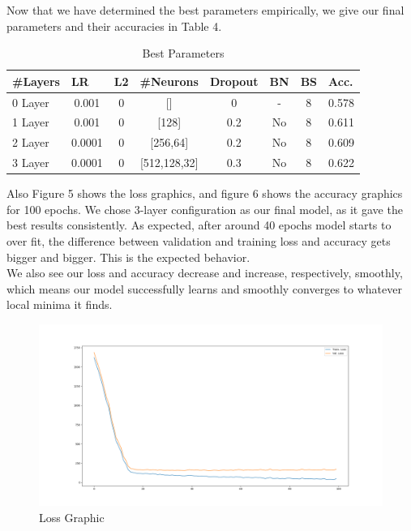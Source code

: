 \documentclass[conference,compsoc]{IEEEtran}
\begin{document}
Now that we have determined the best parameters empirically, we give our final parameters and their accuracies in Table 4.

\begin{table}[]
\centering
\caption{Best Parameters}
\label{my-label}
\begin{tabular}{l|ccccccc}
\#Layers & \multicolumn{1}{l}{LR} & \multicolumn{1}{l}{L2} & \multicolumn{1}{l}{\#Neurons} & \multicolumn{1}{l}{Dropout} & \multicolumn{1}{l}{BN} & \multicolumn{1}{l}{BS} & \multicolumn{1}{l}{Acc.} \\ \hline
0 Layer & 0.001 & 0 & {[}{]} & 0 & - & 8 & 0.578 \\ \cline{2-8} 
1 Layer & 0.001 & 0 & {[}128{]} & 0.2 & No & 8 & 0.611 \\ \cline{2-8} 
2 Layer & 0.0001 & 0 & {[}256,64{]} & 0.2 & No & 8 & 0.609 \\ \cline{2-8} 
3 Layer & 0.0001 & 0 & {[}512,128,32{]} & 0.3 & No & 8 & 0.622
\end{tabular}
\end{table}

Also Figure 5 shows the loss graphics, and figure 6 shows the accuracy graphics for 100 epochs. We chose 3-layer configuration as our final model, as it gave the best results consistently. As expected, after around 40 epochs model starts to over fit, the difference between validation and training loss and accuracy gets bigger and bigger. This is the expected behavior. \\

We also see our loss and accuracy decrease and increase, respectively, smoothly, which means our model successfully learns and smoothly converges to whatever local minima it finds.

\begin{figure}
  \includegraphics[width=\linewidth]{loss.png}
  \caption{Loss Graphic}
  \label{fig:boat1}
\end{figure}
\end{document}
